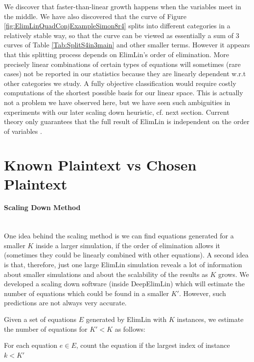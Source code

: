 We discover that faster-than-linear growth happens when the variables meet in the middle. 
We have also discovered that the curve of Figure \ref{fig:ElimLinQuadConjExampleSimon8r4} splits into different  categories in a relatively stable way, so that the curve can be viewed as essentially a sum of 3 curves 
of Table \ref{Tab:SplitS4in3main} and other smaller terms. However it appears that this splitting process depends on ElimLin's order of elimination. 
More precisely linear combinations of certain types of equations will sometimes (rare cases) not be reported in our statistics because they are linearly dependent w.r.t other categories we study. 
A fully objective classification would require costly computations of the shortest possible basis for our linear space. 
This is actually not a problem we have observed here, but we have seen such ambiguities in experiments with our later scaling down heuristic, cf. next section. Current theory only guarantees that the full result of ElimLin is independent on the order of variables \cite{ElimLinRevisit}. 

\section{Known Plaintext vs Chosen Plaintext}
\paragraph{Scaling Down Method} \mbox{} \\
One idea behind the scaling method is we can find equations generated for a smaller $K$ inside a larger simulation, if the order of elimination allows it (sometimes they could be linearly combined with other equations). A second idea is that, therefore, just one large ElimLin simulation reveals a lot of information about smaller simulations and about the scalability of the results as $K$ grows. We developed a scaling down software (inside DeepElimLin) which will estimate the number of equations which could be found in a smaller $K'$. However, such predictions are not always very accurate. 

Given a set of equations $E$ generated by ElimLin with $K$ instances, we estimate the number of equations for $K' < K$ as follows:

For each equation $e \in E$, count the equation if the largest index of instance $k < K'$ 
 
